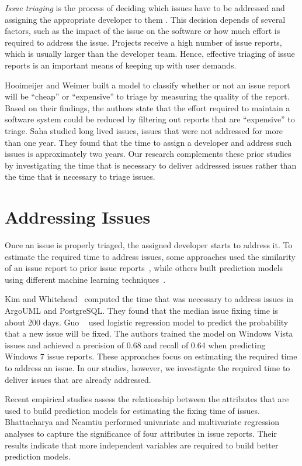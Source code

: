 {\em Issue triaging} is the process of deciding which issues have to be
addressed and assigning the appropriate developer to them \cite{Anvik2006}. This
decision depends of several factors, such as the impact of the issue on the
software or how much effort is required to address the issue.  Projects receive
a high number of issue reports, which is usually larger than the developer team.
Hence, effective triaging of issue reports is an important means of keeping up
with user demands. 

Hooimeijer and Weimer \cite{Hooimeijer2007} built a model to classify whether or
not an issue report will be ``cheap'' or ``expensive'' to triage by measuring
the quality of the report. Based on their findings, the authors state that the
effort required to maintain a software system could be reduced by filtering out
reports that are ``expensive'' to triage. Saha \etal \cite{Saha2014} studied
long lived issues, \ie issues that were not addressed for more than one year.
They found that the time to assign a developer and address such issues is
approximately two years. Our research complements these prior studies by
investigating the time that is necessary to deliver addressed issues 
rather than the time that is necessary to triage issues.

\section{Addressing Issues}
Once an issue is properly triaged, the assigned developer starts to address it.
To estimate the required time
to address issues, some approaches used the similarity of an issue report to
prior issue reports~\cite{Weib2007,Zhang2013}, while others built prediction models using different machine learning
techniques~\cite{Panjer2007,Anbalagan2009,Giger2010, Marks2011}. 

Kim and Whitehead~\cite{Kim2006} computed the time that was necessary to address
issues in ArgoUML and PostgreSQL. They found that the median issue fixing time
is about 200 days. Guo \etal~\cite{Guo2010} used logistic regression model to
predict the probability that a new issue will be fixed. The authors trained the
model on Windows Vista issues and achieved a precision of 0.68 and recall of
0.64 when predicting Windows 7 issue reports. These approaches focus on
estimating the required time to address an issue. In our studies, however, we
investigate the required time to deliver issues that are already addressed.

Recent empirical studies assess the relationship between the attributes that are
used to build prediction models for estimating the fixing time of issues.
Bhattacharya and Neamtiu \cite{Bhattacharya2011} performed univariate and
multivariate regression analyses to capture the significance of four attributes
in issue reports.  Their results indicate that more independent variables are
required to build better prediction models. 

